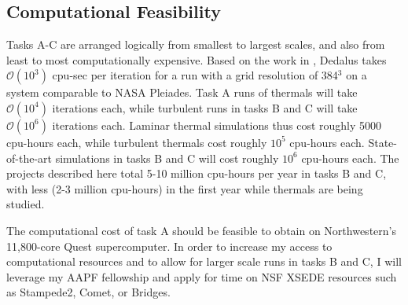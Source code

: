 \documentclass[11pt, preprint]{aastex}
\begin{document}
\vspace{-0.8cm}
\subsection*{Computational Feasibility}
\vspace{-0.3cm}
\label{sct:feasibility}
Tasks A-C are arranged logically from smallest to largest scales, and also from least to most computationally expensive.
Based on the work in \citet{anders&brown2017, anders&all2018, anders&all2019, andersLB2019}, Dedalus takes $\mathcal{O}(10^3)$ cpu-sec per iteration for a run with a grid resolution of 384$^3$ on a system comparable to NASA Pleiades.
Task A runs of thermals will take $\mathcal{O}(10^4)$ iterations each, while turbulent runs in tasks B and C will take $\mathcal{O}(10^6)$ iterations each.
Laminar thermal simulations thus cost roughly 5000 cpu-hours each, while turbulent thermals cost roughly $10^5$ cpu-hours each.
State-of-the-art simulations in tasks B and C will cost roughly $10^6$ cpu-hours each.
The projects described here total 5-10 million cpu-hours per year in tasks B and C, with less (2-3 million cpu-hours) in the first year while thermals are being studied.

The computational cost of task A should be feasible to obtain on Northwestern's 11,800-core Quest supercomputer.
In order to increase my access to computational resources and to allow for larger scale runs in tasks B and C, I will leverage my AAPF fellowship and apply for time on NSF XSEDE resources such as Stampede2, Comet, or Bridges.


\vspace{-0.8cm}
\end{document}
